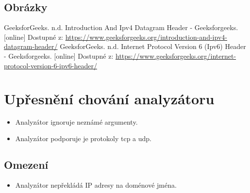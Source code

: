 \documentclass[a4paper, 12pt, titlepage]{article}
\begin{document}
\subsection{Obrázky}
\begin{thebibliography}{99}
 GeeksforGeeks. n.d. Introduction And Ipv4 Datagram Header - Geeksforgeeks. [online] Dostupné z: \url{https://www.geeksforgeeks.org/introduction-and-ipv4-datagram-header/}
 GeeksforGeeks. n.d. Internet Protocol Version 6 (Ipv6) Header - Geeksforgeeks. [online] Dostupné z: \url{https://www.geeksforgeeks.org/internet-protocol-version-6-ipv6-header/}
\end{thebibliography}

\newpage

\section{Upřesnění chování analyzátoru}
\begin{itemize}
    \item Analyzátor ignoruje neznámé argumenty.
    \item Analyzátor podporuje je protokoly tcp a udp.
    \end{itemize}
\subsection{Omezení}
\begin{itemize}
  \item Analyzátor nepřekládá IP adresy na doménové jména.
\end{itemize}
\end{document}
